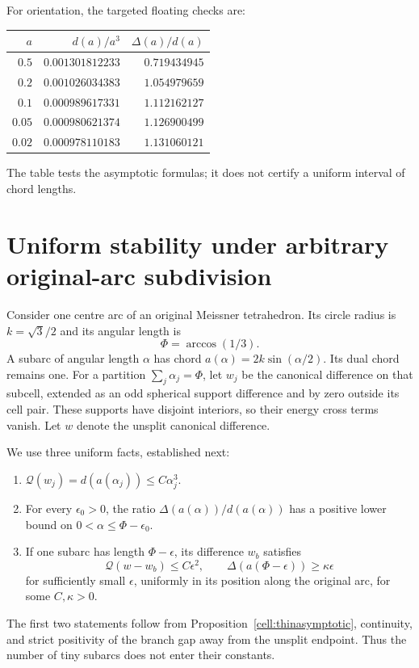 \documentclass[11pt]{article}
\theoremstyle{remark}\newtheorem{remark}[theorem]{Remark}
\newcommand{\Q}{\mathcal Q}
\begin{document}
For orientation, the targeted floating checks are:
\begin{center}
\begin{tabular}{rrr}\toprule
$a$ & $d(a)/a^3$ & $\Delta(a)/d(a)$\\\midrule
$0.5$ & $0.001301812233$ & $0.719434945$\\
$0.2$ & $0.001026034383$ & $1.054979659$\\
$0.1$ & $0.000989617331$ & $1.112162127$\\
$0.05$ & $0.000980621374$ & $1.126900499$\\
$0.02$ & $0.000978110183$ & $1.131060121$\\\bottomrule
\end{tabular}
\end{center}
The table tests the asymptotic formulas; it does not certify a uniform interval of chord lengths.

\section{Uniform stability under arbitrary original-arc subdivision}\label{cell:refinements}
Consider one centre arc of an original Meissner tetrahedron. Its circle radius is $k=\sqrt3/2$ and its angular length is
\[
 \Phi=\arccos(1/3).
\]
A subarc of angular length $\alpha$ has chord
$a(\alpha)=2k\sin(\alpha/2)$. Its dual chord remains one.
For a partition $\sum_j\alpha_j=\Phi$, let $w_j$ be the canonical difference on that subcell, extended as an odd spherical support difference and by zero outside its cell pair. These supports have disjoint interiors, so their energy cross terms vanish. Let $w$ denote the unsplit canonical difference.

We use three uniform facts, established next:
\begin{enumerate}
\item $\Q(w_j)=d(a(\alpha_j))\leq C\alpha_j^3$.
\item For every $\epsilon_0>0$, the ratio $\Delta(a(\alpha))/d(a(\alpha))$ has a positive lower bound on $0<\alpha\leq\Phi-\epsilon_0$.
\item If one subarc has length $\Phi-\epsilon$, its difference $w_b$ satisfies
\begin{equation}\label{cell:biglimits}
 \Q(w-w_b)\leq C\epsilon^2,\qquad
 \Delta(a(\Phi-\epsilon))\geq\kappa\epsilon
\end{equation}
for sufficiently small $\epsilon$, uniformly in its position along the original arc, for some $C,\kappa>0$.
\end{enumerate}
The first two statements follow from Proposition~\ref{cell:thinasymptotic}, continuity, and strict positivity of the branch gap away from the unsplit endpoint. Thus the number of tiny subarcs does not enter their constants.
\end{document}
